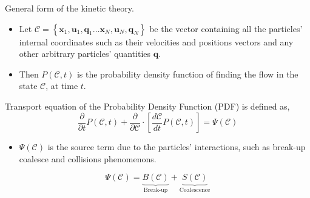\documentclass{sintefbeamer}
\newcommand{\pddt}{\frac{\partial}{\partial t}}
\begin{document}
\begin{frame}{General form of the kinetic theory.}
  \begin{definition}
    \begin{itemize}
      \item Let $\mathscr{C} =\left\{\textbf{x}_1,\textbf{u}_1, \textbf{q}_1\ldots\textbf{x}_N,\textbf{u}_N, \textbf{q}_N\right\}$ be the vector containing all the particles' internal coordinates such as their velocities and positions vectors and any other arbitrary particles' quantities $\textbf{q}$. 
      \item Then $P(\mathscr{C},t)$ is the probability density function of finding the flow in the state $\mathscr{C}$, at time $t$. 
    \end{itemize}
  \end{definition}
  Transport equation of the Probability Density Function (PDF) is defined as,
  \begin{equation}
    \pddt P(\mathscr{C},t)
    + \frac{\partial}{\partial \mathscr{C}} \cdot
    \left[
        \frac{d\mathscr{C}}{dt}  
        P(\mathscr{C},t)
    \right]
    = \Psi(\mathscr{C})
    \label{eq:dt_P}
\end{equation}

  \begin{itemize}
    \item $\Psi(\mathscr{C})$ is the source term due to the particles' interactions, such as break-up coalesce and collisions phenomenons. 
  \end{itemize}
  \begin{equation*}
    \Psi(\mathscr{C}) =
    \underbrace{B(\mathscr{C})}_{\text{Break-up}}
    +\underbrace{S(\mathscr{C})}_{\text{Coalescence}}
  \end{equation*}
\end{frame}
\end{document}

